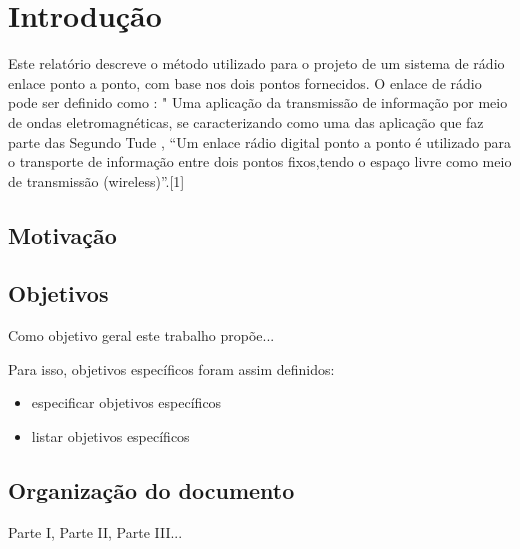 
\chapter*[Introdução]{Introdução}

Este relatório descreve o método utilizado para o projeto de um sistema de rádio enlace ponto a ponto, com base nos dois pontos fornecidos. O enlace de rádio pode ser definido como : "
Uma aplicação da transmissão de informação por meio de ondas eletromagnéticas, se caracterizando como uma das aplicação que faz parte das Segundo Tude , “Um enlace rádio digital ponto a ponto é utilizado para o transporte de informação entre dois pontos fixos,tendo o espaço livre como meio de transmissão (wireless)”.[1]

\section*{Motivação}\label{sec:motivacao}

\lipsum[35]

\section*{Objetivos}\label{sec:objetivos}

Como objetivo geral este trabalho propõe...

Para isso, objetivos específicos foram assim definidos:

\begin{itemize}
\item especificar objetivos específicos
\item listar objetivos específicos
\end{itemize}

\section*{Organização do documento}\label{sec:objetivos}

Parte I, Parte II, Parte III... \lipsum[32]

